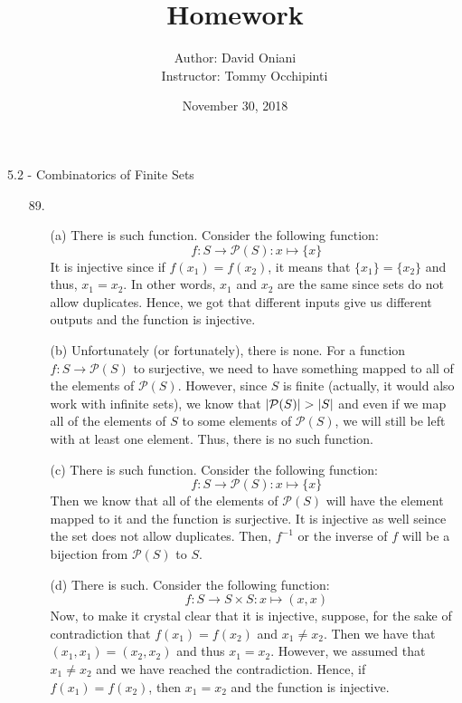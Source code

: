 \documentclass[12pt, a4paper]{article}
\title{\bf{Homework \textnumero 13}}
\author{Author: David Oniani
\\
\ \ \ Instructor: Tommy Occhipinti}
\date{November 30, 2018}
\DeclarePairedDelimiter\abs{\lvert}{\rvert}
\newcommand{\rarr}{\rightarrow}
\begin{document}
\maketitle
{\Large 5.2 - Combinatorics of Finite Sets}
\begin{itemize}
\item[89.]
\begin{itemize}
\item[(a)]
There is such function. Consider the following function:
$$f : S \rarr \mathcal{P}(S) : x \mapsto \{x\}$$
It is injective since if $f(x_1) = f(x_2)$, it means that $\{x_1\} = \{x_2\}$
and thus, $x_1 = x_2$. In other words, $x_1$ and $x_2$ are the same since sets do not
allow duplicates. Hence, we got that different inputs give us different outputs and the
function is injective.

\item[]

\item[(b)]
Unfortunately (or fortunately), there is none. For a function $f : S \rarr \mathcal{P}(S)$
to surjective, we need to have something mapped to all of the elements of $\mathcal{P}(S)$.
However, since $S$ is finite (actually, it would also work with infinite sets), we know that $\abs{\mathcal{P}(S)} > \abs{S}$ and even if
we map all of the elements of $S$ to some elements of $\mathcal{P}(S)$, we will still be left
with at least one element. Thus, there is no such function.

\item[]

\item[(c)]
There is such function. Consider the following function:
$$f : S \rarr \mathcal{P}(S) : x \mapsto \{x\}$$
Then we know that all of the elements of $\mathcal{P}(S)$ will have the element
mapped to it and the function is surjective. It is injective as well seince the set does not
allow duplicates. Then, $f^{-1}$ or the inverse of $f$ will be a bijection from $\mathcal{P}(S)$
to $S$.
\item[]

\item[(d)]
There is such. Consider the following function:
$$f : S \rarr S \times S : x \mapsto (x, x)$$
Now, to make it crystal clear that it is injective, suppose, for the sake
of contradiction that $f(x_1) = f(x_2)$ and $x_1 \neq x_2$. Then we have that
$(x_1, x_1) = (x_2, x_2)$ and thus $x_1 = x_2$. However, we assumed that $x_1 \neq x_2$
and we have reached the contradiction. Hence, if $f(x_1) = f(x_2)$, then $x_1 = x_2$
and the function is injective.


\end{itemize}
\end{itemize}
\end{document}
